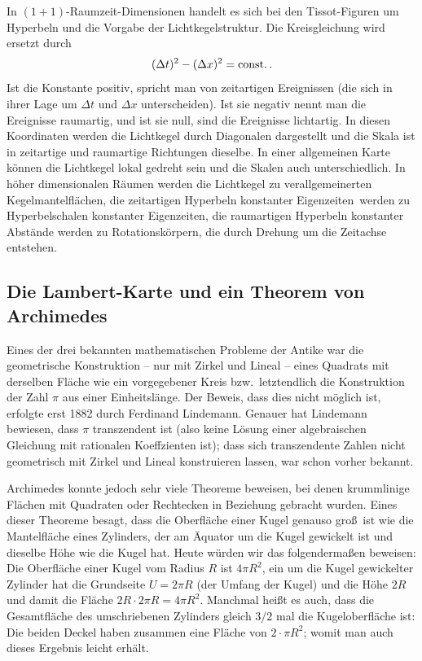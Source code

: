 In $(1+1)$-Raumzeit-Dimensionen handelt es sich bei den Tissot-Figuren um Hyperbeln und
die Vorgabe der Lichtkegelstruktur. 
Die Kreisgleichung wird ersetzt durch
\begin{equation}
                          (\Delta t)^2 - (\Delta x)^2 = {\rm const.}   \, .
\end{equation} 
Ist die Konstante positiv, spricht man von 
zeitartigen Ereignissen (die sich in ihrer
Lage um $\Delta t$ und $\Delta x$ unterscheiden). Ist sie negativ nennt man die Ereignisse
raumartig, und ist sie null, sind die Ereignisse lichtartig. 
In diesen Koordinaten werden die
Lichtkegel durch Diagonalen dargestellt und die Skala ist in zeitartige und raumartige Richtungen
dieselbe. In einer allgemeinen Karte k\"onnen die Lichtkegel lokal gedreht sein und die Skalen
auch unterschiedlich. In h\"oher dimensionalen R\"aumen werden die Lichtkegel zu verallgemeinerten
Kegelmantelfl\"achen, die zeitartigen \glqq Hyperbeln konstanter Eigenzeiten\grqq\ werden zu
 \glqq Hyperbelschalen konstanter Eigenzeiten\grqq, die raumartigen Hyperbeln konstanter Abst\"ande
 werden zu Rotationsk\"orpern, die durch Drehung um die Zeitachse entstehen.

\subsection{Die Lambert-Karte und ein Theorem von Archimedes}

Eines der drei bekannten mathematischen Probleme der Antike war die geometrische Konstruktion --
nur mit Zirkel und Lineal -- eines Quadrats mit derselben Fl\"ache wie ein vorgegebener Kreis
bzw.\ letztendlich die Konstruktion der Zahl $\pi$ aus einer Einheitsl\"ange. Der Beweis, dass
dies nicht m\"oglich ist, erfolgte erst 1882 durch 
Ferdinand Lindemann. Genauer hat Lindemann
bewiesen, dass $\pi$ trans\-zendent ist (also keine L\"osung einer algebraischen Gleichung mit rationalen
Koeffzienten ist); dass sich transzendente Zahlen nicht geometrisch mit Zirkel und Lineal
konstruieren lassen, war schon vorher bekannt. 

Archimedes 
konnte jedoch sehr viele Theoreme beweisen, bei denen krummlinige Fl\"achen
mit Quadraten oder Rechtecken in Beziehung gebracht wurden. Eines dieser Theoreme
besagt, dass die Oberfl\"ache einer Kugel genauso gro\ss\ ist wie die Mantelfl\"ache eines
Zylinders, der am \"Aquator um die Kugel gewickelt ist und dieselbe H\"ohe wie die Kugel hat. 
Heute w\"urden wir das folgenderma\ss en beweisen: Die Oberfl\"ache einer Kugel vom Radius $R$
ist $4\pi R^2$, ein um die Kugel gewickelter Zylinder hat die Grundseite $U=2\pi R$ (der Umfang
der Kugel) und die H\"ohe $2R$ und damit die Fl\"ache $2R\cdot 2\pi R = 4\pi R^2$. Manchmal
hei\ss t es auch, dass die Gesamtfl\"ache des umschriebenen Zylinders gleich $3/2$ mal
die Kugeloberfl\"ache ist: Die beiden Deckel haben zusammen eine Fl\"ache von $2 \cdot \pi R^2$; womit
man auch dieses Ergebnis leicht erh\"alt.   

